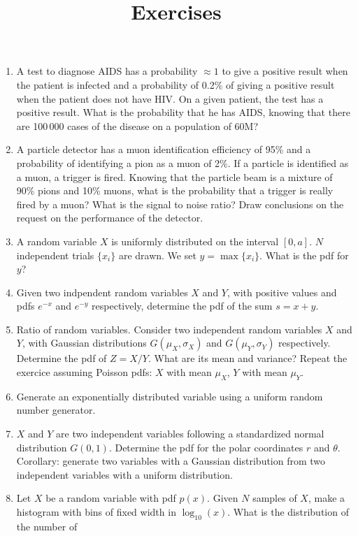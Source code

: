 \documentclass[a4paper,12pt]{article}
\title{Exercises}
\author{}
\date{}
\begin{document}
 \maketitle
 
 \begin{enumerate}
  \item A test to diagnose AIDS has a probability $\approx 1$ to give a positive result when the patient is infected and a probability of 0.2\% of giving a positive result when the patient
  does not have HIV. On a given patient, the test has a positive result. What is the probability that he has AIDS, knowing that there are 100\,000 cases of the disease on a population
  of 60M?
  \item A particle detector has a muon identification efficiency of 95\% and a probability of identifying a pion as a muon of 2\%. If a particle is identified as a muon, a trigger is
  fired. Knowing that the particle beam is a mixture of 90\% pions and 10\% muons, what is the probability that a trigger is really fired by a muon? What is the signal to noise ratio?
  Draw conclusions on the request on the performance of the detector.
  \item A random variable $X$ is uniformly distributed on the interval $[0,a]$. $N$ independent trials $\{x_i\}$ are drawn. We set $y = \max\{x_i\}$. What is the pdf for $y$?
  \item Given two indpendent random variables $X$ and $Y$, with positive values and pdfs $e^{-x}$ and $e^{-y}$ respectively, determine the pdf of the sum $s = x+y$.
  \item Ratio of random variables. Consider two independent random variables $X$ and $Y$, with Gaussian distributions $G(\mu_X,\sigma_X)$ and $G(\mu_Y,\sigma_Y)$ respectively. Determine
  the pdf of $Z = X/Y$. What are its mean and variance? Repeat the exercice assuming Poisson pdfs: $X$ with mean $\mu_X$, $Y$ with mean $\mu_Y$.
  \item Generate an exponentially distributed variable using a uniform random number generator.
  \item $X$ and $Y$ are two independent variables following a standardized normal distribution $G(0,1)$. Determine the pdf for the polar coordinates $r$ and $\theta$.\\
  Corollary: generate two variables with a Gaussian distribution from two independent variables with a uniform distribution.
  \item Let $X$ be a random variable with pdf $p(x)$. Given $N$ samples of $X$, make a histogram with bins of fixed width in $\log_{10}(x)$. What is the distribution of the number of

\end{enumerate}
\end{document}

